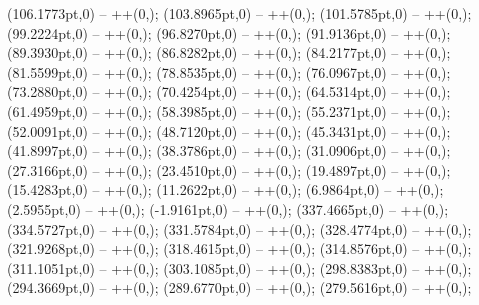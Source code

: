 {   (106.1773pt,0) -- ++(0,\centesimos);
   (103.8965pt,0) -- ++(0,\centesimos);
   (101.5785pt,0) -- ++(0,\centesimos);
   (99.2224pt,0) -- ++(0,\centesimos);
   (96.8270pt,0) -- ++(0,\centesimos);
   (91.9136pt,0) -- ++(0,\centesimos);
   (89.3930pt,0) -- ++(0,\centesimos);
   (86.8282pt,0) -- ++(0,\centesimos);
   (84.2177pt,0) -- ++(0,\centesimos);
   (81.5599pt,0) -- ++(0,\centesimos);
   (78.8535pt,0) -- ++(0,\centesimos);
   (76.0967pt,0) -- ++(0,\centesimos);
   (73.2880pt,0) -- ++(0,\centesimos);
   (70.4254pt,0) -- ++(0,\centesimos);
   (64.5314pt,0) -- ++(0,\centesimos);
   (61.4959pt,0) -- ++(0,\centesimos);
   (58.3985pt,0) -- ++(0,\centesimos);
   (55.2371pt,0) -- ++(0,\centesimos);
   (52.0091pt,0) -- ++(0,\centesimos);
   (48.7120pt,0) -- ++(0,\centesimos);
   (45.3431pt,0) -- ++(0,\centesimos);
   (41.8997pt,0) -- ++(0,\centesimos);
   (38.3786pt,0) -- ++(0,\centesimos);
   (31.0906pt,0) -- ++(0,\centesimos);
   (27.3166pt,0) -- ++(0,\centesimos);
   (23.4510pt,0) -- ++(0,\centesimos);
   (19.4897pt,0) -- ++(0,\centesimos);
   (15.4283pt,0) -- ++(0,\centesimos);
   (11.2622pt,0) -- ++(0,\centesimos);
   (6.9864pt,0) -- ++(0,\centesimos);
   (2.5955pt,0) -- ++(0,\centesimos);
   (-1.9161pt,0) -- ++(0,\centesimos);
   (337.4665pt,0) -- ++(0,\decimos);
   (334.5727pt,0) -- ++(0,\decimos);
   (331.5784pt,0) -- ++(0,\decimos);
   (328.4774pt,0) -- ++(0,\decimos);
   (321.9268pt,0) -- ++(0,\decimos);
   (318.4615pt,0) -- ++(0,\decimos);
   (314.8576pt,0) -- ++(0,\decimos);
   (311.1051pt,0) -- ++(0,\decimos);
   (303.1085pt,0) -- ++(0,\decimos);
   (298.8383pt,0) -- ++(0,\decimos);
   (294.3669pt,0) -- ++(0,\decimos);
   (289.6770pt,0) -- ++(0,\decimos);
   (279.5616pt,0) -- ++(0,\decimos);
}
